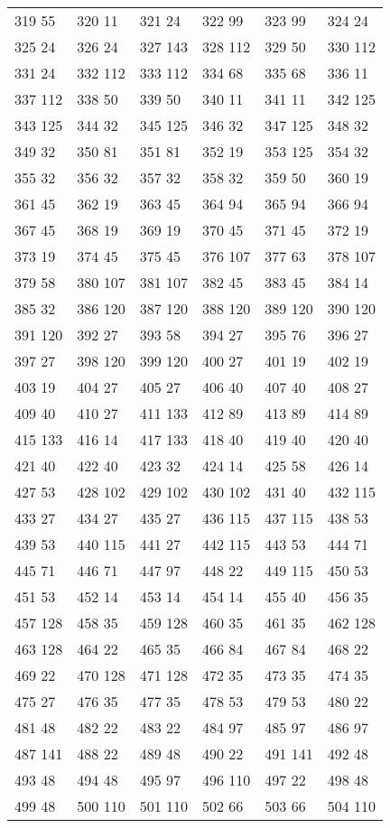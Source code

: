 \begin{longtable}{llllll}
319  55&320 11&321 24&322 99&323 99&324 24\\
325  24&326 24&327 143&328 112&329 50&330 112\\
331  24&332 112&333 112&334 68&335 68&336 11\\
337  112&338 50&339 50&340 11&341 11&342 125\\
343  125&344 32&345 125&346 32&347 125&348 32\\
349  32&350 81&351 81&352 19&353 125&354 32\\
355  32&356 32&357 32&358 32&359 50&360 19\\
361  45&362 19&363 45&364 94&365 94&366 94\\
367  45&368 19&369 19&370 45&371 45&372 19\\
373  19&374 45&375 45&376 107&377 63&378 107\\
379  58&380 107&381 107&382 45&383 45&384 14\\
385  32&386 120&387 120&388 120&389 120&390 120\\
391  120&392 27&393 58&394 27&395 76&396 27\\
397  27&398 120&399 120&400 27&401 19&402 19\\
403  19&404 27&405 27&406 40&407 40&408 27\\
409  40&410 27&411 133&412 89&413 89&414 89\\
415  133&416 14&417 133&418 40&419 40&420 40\\
421  40&422 40&423 32&424 14&425 58&426 14\\
427  53&428 102&429 102&430 102&431 40&432 115\\
433  27&434 27&435 27&436 115&437 115&438 53\\
439  53&440 115&441 27&442 115&443 53&444 71\\
445  71&446 71&447 97&448 22&449 115&450 53\\
451  53&452 14&453 14&454 14&455 40&456 35\\
457  128&458 35&459 128&460 35&461 35&462 128\\
463  128&464 22&465 35&466 84&467 84&468 22\\
469  22&470 128&471 128&472 35&473 35&474 35\\
475  27&476 35&477 35&478 53&479 53&480 22\\
481  48&482 22&483 22&484 97&485 97&486 97\\
487  141&488 22&489 48&490 22&491 141&492 48\\
493  48&494 48&495 97&496 110&497 22&498 48\\
499  48&500 110&501 110&502 66&503 66&504 110\\

\end{longtable}
